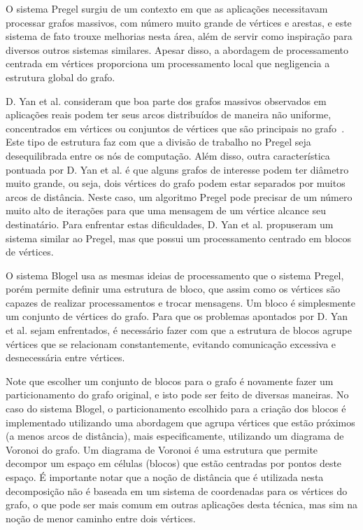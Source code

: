 \documentclass[conference]{IEEEtran}
\begin{document}



O sistema Pregel surgiu de um contexto em que as aplicações necessitavam
processar grafos massivos, com número muito grande de vértices e
arestas, e este sistema de fato trouxe melhorias nesta área, além de
servir como inspiração para diversos outros sistemas similares. Apesar
disso, a abordagem de processamento centrada em vértices proporciona um
processamento local que negligencia a estrutura global do grafo.

D. Yan et al. consideram que boa parte dos grafos massivos observados em
aplicações reais podem ter seus arcos distribuídos de maneira não
uniforme, concentrados em vértices ou conjuntos de vértices que são
principais no grafo~\cite{blogel}. Este tipo de estrutura faz com que a
divisão de trabalho no Pregel seja desequilibrada entre os nós de
computação. Além disso, outra característica pontuada por D. Yan et al.
é que alguns grafos de interesse podem ter diâmetro muito grande, ou
seja, dois vértices do grafo podem estar separados por muitos arcos de
distância. Neste caso, um algoritmo Pregel pode precisar de um número
muito alto de iterações para que uma mensagem de um vértice alcance seu
destinatário. Para enfrentar estas dificuldades, D. Yan et al.
propuseram um sistema similar ao Pregel, mas que possui um processamento
centrado em blocos de vértices.

O sistema Blogel usa as mesmas ideias de processamento que o sistema
Pregel, porém permite definir uma estrutura de bloco, que assim como os
vértices são capazes de realizar processamentos e trocar mensagens. Um
bloco é simplesmente um conjunto de vértices do grafo. Para que os
problemas apontados por D. Yan et al. sejam enfrentados, é necessário
fazer com que a estrutura de blocos agrupe vértices que se relacionam
constantemente, evitando comunicação excessiva e desnecessária entre
vértices.

Note que escolher um conjunto de blocos para o grafo é novamente fazer
um particionamento do grafo original, e isto pode ser feito de diversas
maneiras. No caso do sistema Blogel, o particionamento escolhido para a
criação dos blocos é implementado utilizando uma abordagem que agrupa
vértices que estão próximos (a menos arcos de distância), mais
especificamente, utilizando um diagrama de Voronoi do grafo. Um diagrama
de Voronoi é uma estrutura que permite decompor um espaço em células
(blocos) que estão centradas por pontos deste espaço. É importante notar
que a noção de distância que é utilizada nesta decomposição não é
baseada em um sistema de coordenadas para os vértices do grafo, o que
pode ser mais comum em outras aplicações desta técnica, mas sim na noção
de menor caminho entre dois vértices.
\end{document}
